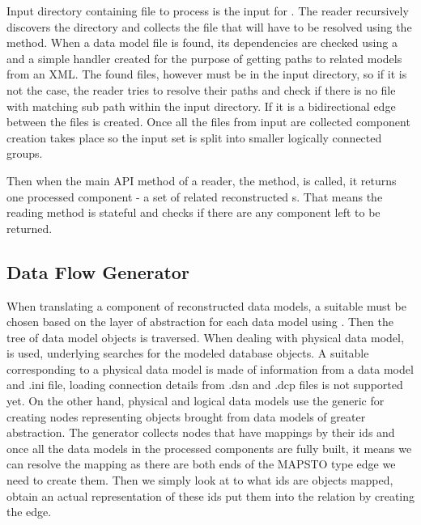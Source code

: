 Input directory containing file to process is the input for . The reader recursively discovers the directory and collects the file that will have to be resolved using the  method. When a data model file is found, its dependencies are checked using a  and a simple handler  created for the purpose of getting paths to related models from an XML. The found files, however must be in the input directory, so if it is not the case, the reader tries to resolve their paths and check if there is no file with matching sub path within the input directory. If it is a bidirectional edge between the files is created. 
Once all the files from input are collected component creation takes place so the input set is split into smaller logically connected groups.

Then when the main API method of a reader, the  method, is called, it returns one processed component - a set of related reconstructed s. 
That means the reading method is stateful and  checks if there are any component left to be returned.

\subsection{Data Flow Generator}

When translating a component of reconstructed data models, a suitable  must be chosen based on the layer of abstraction for each data model using .
Then the tree of data model objects is traversed. When dealing with physical data model,  is used, underlying  searches for the modeled database objects. A suitable  corresponding to a physical data model is made of information from a data model and .ini file, loading connection details from .dsn and .dcp files is not supported yet.
On the other hand, physical and logical data models use the generic  for creating nodes representing objects brought from data models of greater abstraction.
The generator collects nodes that have mappings by their ids and once all the data models in the processed components are fully built, it means we can resolve the mapping as there are both ends of the MAPS\textunderscore TO type edge we need to create them. Then we simply look at to what ids are objects mapped, obtain an actual representation of these ids put them into the relation by creating the edge.

